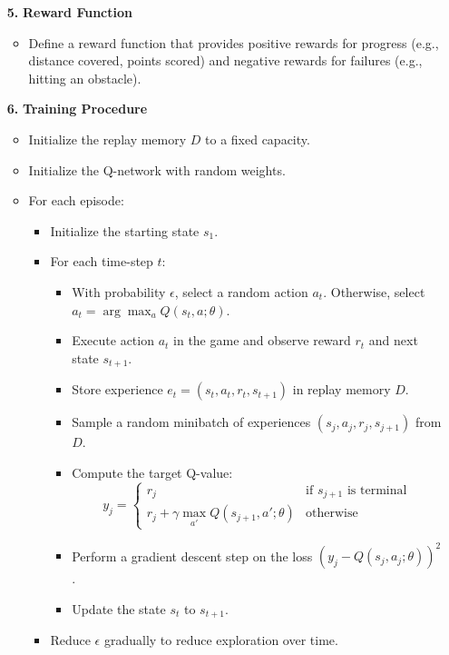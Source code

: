 \documentclass{article} %
\begin{document}
\begin{itemize}
    \item[\textbf{5.}] \textbf{Reward Function}
    \begin{itemize}
        \item Define a reward function that provides positive rewards for 
        progress (e.g., distance covered, points scored) and negative rewards 
        for failures (e.g., hitting an obstacle).
    \end{itemize}

    \item[\textbf{6.}] \textbf{Training Procedure}
    \begin{itemize}
        \item Initialize the replay memory \( D \) to a fixed capacity.
        \item Initialize the Q-network with random weights.
        \item For each episode:
        \begin{itemize}
            \item Initialize the starting state \( s_1 \).
            \item For each time-step \( t \):
            \begin{itemize}
                \item With probability \( \epsilon \), select a random action \( a_t \). Otherwise, select \( a_t = \arg\max_a Q(s_t, a; \theta) \).
                \item Execute action \( a_t \) in the game and observe reward \( r_t \) and next state \( s_{t+1} \).
                \item Store experience \( e_t = (s_t, a_t, r_t, s_{t+1}) \) in replay memory \( D \).
                \item Sample a random minibatch of experiences \( (s_j, a_j, r_j, s_{j+1}) \) from \( D \).
                \item Compute the target Q-value:
                \[
                y_j = \begin{cases}
                r_j & \text{if } s_{j+1} \text{ is terminal} \\
                r_j + \gamma \max_{a'} Q(s_{j+1}, a'; \theta) & \text{otherwise}
                \end{cases}
                \]
                \item Perform a gradient descent step on the loss \( (y_j - Q(s_j, a_j; \theta))^2 \).
                \item Update the state \( s_t \) to \( s_{t+1} \).
            \end{itemize}
            \item Reduce \( \epsilon \) gradually to reduce exploration over time.
        \end{itemize}
    \end{itemize}
\end{itemize}
\end{document}
